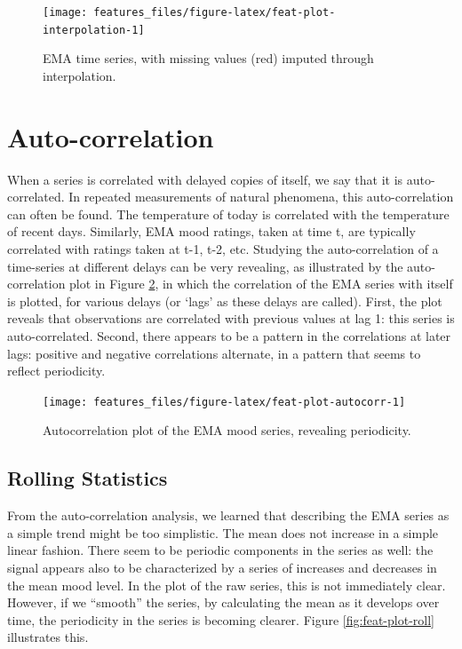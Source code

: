 \documentclass[]{book}
\begin{document}
\begin{figure}

{\centering \texttt{[image: features\_files/figure-latex/feat-plot-interpolation-1]} 

}

\caption{EMA time series, with missing values (red) imputed through interpolation.}\label{fig:feat-plot-interpolation}
\end{figure}

\section{Auto-correlation}\label{auto-correlation}


When a series is correlated with delayed copies of itself, we say that
it is auto-correlated. In repeated measurements of natural phenomena,
this auto-correlation can often be found. The temperature of today is
correlated with the temperature of recent days. Similarly, EMA mood
ratings, taken at time t, are typically correlated with ratings taken at
t-1, t-2, etc. Studying the auto-correlation of a time-series at
different delays can be very revealing, as illustrated by the
auto-correlation plot in Figure \ref{fig:feat-plot-autocorr}, in which
the correlation of the EMA series with itself is plotted, for various
delays (or `lags' as these delays are called). First, the plot reveals
that observations are correlated with previous values at lag 1: this
series is auto-correlated. Second, there appears to be a pattern in the
correlations at later lags: positive and negative correlations
alternate, in a pattern that seems to reflect periodicity.

\begin{figure}

{\centering \texttt{[image: features\_files/figure-latex/feat-plot-autocorr-1]} 

}

\caption{Autocorrelation plot of the EMA mood series, revealing periodicity.}\label{fig:feat-plot-autocorr}
\end{figure}

\subsection{Rolling Statistics}\label{rolling-statistics}

From the auto-correlation analysis, we learned that describing the EMA
series as a simple trend might be too simplistic. The mean does not
increase in a simple linear fashion. There seem to be periodic
components in the series as well: the signal appears also to be
characterized by a series of increases and decreases in the mean mood
level. In the plot of the raw series, this is not immediately clear.
However, if we ``smooth'' the series, by calculating the mean as it
develops over time, the periodicity in the series is becoming clearer.
Figure \ref{fig:feat-plot-roll} illustrates this.
\end{document}
